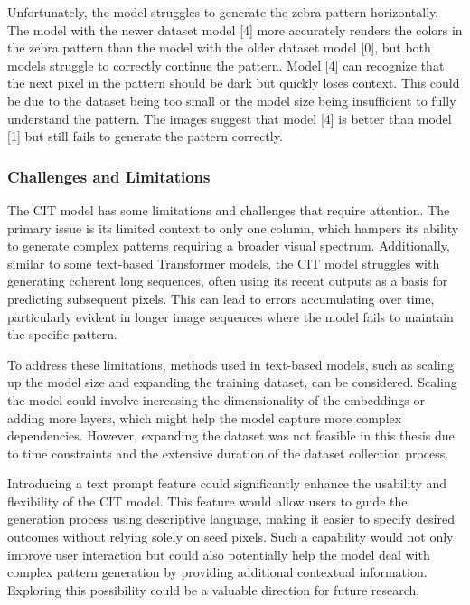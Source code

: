\begin{itemize}
        Unfortunately, the model struggles to generate the zebra pattern horizontally. The model with the newer dataset model [4] more accurately renders the colors in the zebra pattern than the model with the older dataset model [0], but both models struggle to correctly continue the pattern. Model [4] can recognize that the next pixel in the pattern should be dark but quickly loses context. This could be due to the dataset being too small or the model size being insufficient to fully understand the pattern. The images suggest that model [4] is better than model [1] but still fails to generate the pattern correctly.
       
    \end{itemize}

    \subsubsection{Challenges and Limitations}

    The CIT model has some limitations and challenges that require attention. The primary issue is its limited context to only one column, which hampers its ability to generate complex patterns requiring a broader visual spectrum. Additionally, similar to some text-based Transformer models, the CIT model struggles with generating coherent long sequences, often using its recent outputs as a basis for predicting subsequent pixels. This can lead to errors accumulating over time, particularly evident in longer image sequences where the model fails to maintain the specific pattern. 

    To address these limitations, methods used in text-based models, such as scaling up the model size and expanding the training dataset, can be considered. Scaling the model could involve increasing the dimensionality of the embeddings or adding more layers, which might help the model capture more complex dependencies. However, expanding the dataset was not feasible in this thesis due to time constraints and the extensive duration of the dataset collection process.

    Introducing a text prompt feature could significantly enhance the usability and flexibility of the CIT model. This feature would allow users to guide the generation process using descriptive language, making it easier to specify desired outcomes without relying solely on seed pixels. Such a capability would not only improve user interaction but could also potentially help the model deal with complex pattern generation by providing additional contextual information. Exploring this possibility could be a valuable direction for future research.
